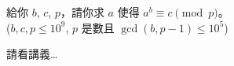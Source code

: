 \documentclass[standalone]{beamer}
\begin{document}
\begin{frame}
  \begin{problem}
    給你 $b$, $c$, $p$，請你求 $a$ 使得 $a^b \equiv c \pmod{p}$。\\
    ($b, c, p \leq 10^9$, $p$ 是數且 $\gcd(b, p-1) \leq 10^5$)
  \end{problem} \pause

  請看講義…
\end{frame}
\end{document}
